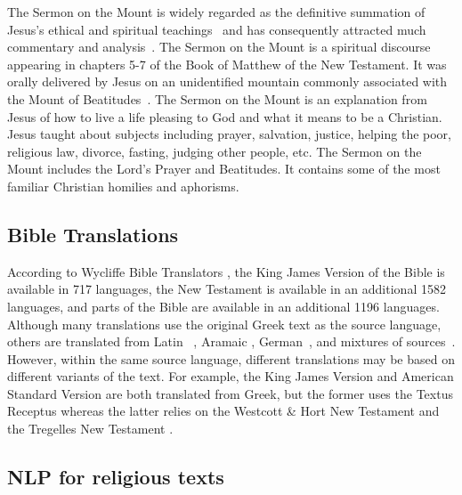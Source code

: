 \documentclass[5p,times]{elsarticle}
\begin{document}
 The Sermon on the Mount is widely regarded as the definitive summation of Jesus's ethical and spiritual teachings~\cite{davies1966sermon} and has consequently attracted much commentary and analysis~\cite{keener2009gospel}. The Sermon on the Mount is a spiritual discourse appearing in chapters 5-7 of the Book of Matthew of the New Testament. It was orally delivered by Jesus on an unidentified mountain commonly associated with the Mount of Beatitudes~\cite{macmillan1968atlas}. The Sermon on the Mount is an explanation from Jesus of how to live a life pleasing to God and what it means to be a Christian.  Jesus taught about subjects including prayer, salvation, justice, helping the poor, religious law, divorce, fasting, judging other people, etc. The Sermon on the Mount includes the Lord's Prayer and Beatitudes. It contains some of the most familiar Christian homilies and aphorisms.
 
 \subsection{Bible Translations}
  
 According to Wycliffe Bible Translators \cite{wycliffebibletranslators}, the King James Version of the Bible is available in 717 languages, the New Testament is available in an additional 1582 languages, and parts of the Bible are available in an additional 1196 languages. Although many translations use the original Greek text as the source language, others are translated from Latin ~\cite{wycliffe1388bible}, Aramaic 
 \cite{lamsa1933bible}, German~\cite{tyndale1526bible}, and mixtures of sources~\cite{matthew1537bible}. However,  within the same source language, different translations may be based on different variants of the text. For example, the King James Version \cite{carroll2008bible} and American Standard Version \cite{bible1995new} are both translated from Greek, but the former uses the Textus Receptus \cite{combs1996erasmus} whereas the latter relies on the Westcott \& Hort New Testament \cite{westcott1882new} and the Tregelles New Testament \cite{tregelles1857greek}.  
 

  
    
     
   

\subsection{NLP for religious texts}
\end{document}
